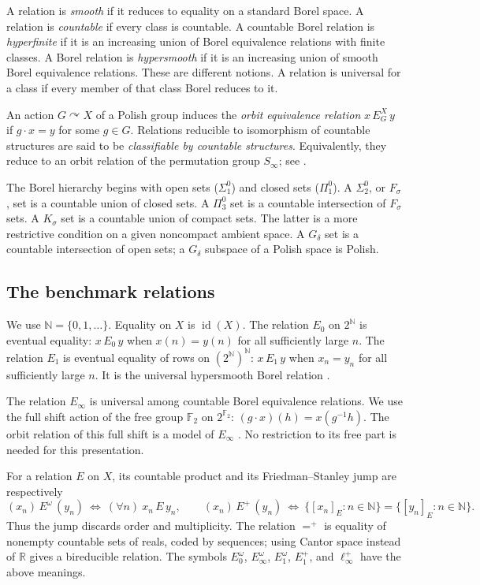 \documentclass[11pt]{article}
\numberwithin{equation}{section}
\theoremstyle{definition}
\newcommand{\N}{\mathbb N}
\newcommand{\R}{\mathbb R}
\newcommand{\id}{\operatorname{id}}
\begin{document}
A relation is \emph{smooth} if it reduces to equality on a standard
Borel space. A relation is \emph{countable} if every class is countable.
A countable Borel relation is \emph{hyperfinite} if it is an increasing
union of Borel equivalence relations with finite classes.
A Borel relation is \emph{hypersmooth} if it is an increasing
union of smooth Borel equivalence relations.
These are different notions. A relation is universal for a class if every member of that class Borel reduces to it.

An action $G\curvearrowright X$ of a Polish group induces the
\emph{orbit equivalence relation}
$x\,E_G^X\,y$ if $g\cdot x=y$ for some $g\in G$.
Relations reducible to isomorphism of countable structures are
said to be \emph{classifiable by countable structures}.
Equivalently, they reduce to an orbit relation of the permutation
group $S_\infty$; see \cite{BK,Gao}.

The Borel hierarchy begins with open sets ($\Sigma^0_1$) and
closed sets ($\Pi^0_1$). A $\Sigma^0_2$, or $F_\sigma$, set is
a countable union of closed sets. A $\Pi^0_3$ set is a countable
intersection of $F_\sigma$ sets. A $K_\sigma$ set is a
countable union of compact sets. The latter is a more restrictive
condition on a given noncompact ambient space.
A $G_\delta$ set is a countable intersection of open sets; a
$G_\delta$ subspace of a Polish space is Polish.

\subsection{The benchmark relations}
We use $\N=\{0,1,\ldots\}$. Equality on $X$ is $\id(X)$.
The relation $E_0$ on $2^\N$ is eventual equality:
$x\,E_0\,y$ when $x(n)=y(n)$ for all sufficiently large $n$.
The relation $E_1$ is eventual equality of rows on
$(2^\N)^\N$: $x\,E_1\,y$ when $x_n=y_n$ for all sufficiently
large $n$. It is the universal hypersmooth Borel relation
\cite{KL,Gao}.

The relation $E_\infty$ is universal among countable Borel equivalence
relations. We use the full shift action of the free group
$\mathbb F_2$ on $2^{\mathbb F_2}$:
$(g\cdot x)(h)=x(g^{-1}h)$. The orbit relation of this full
shift is a model of $E_\infty$ \cite{Gao}.
No restriction to its free part is needed for this presentation.

For a relation $E$ on $X$, its countable product and its
Friedman--Stanley jump are respectively
\[
 (x_n)\,E^\omega\,(y_n)\ \Longleftrightarrow\
       (\forall n)\ x_n\,E\,y_n,
 \qquad
 (x_n)\,E^+\,(y_n)\ \Longleftrightarrow\
       \{[x_n]_E:n\in\N\}=\{[y_n]_E:n\in\N\}.
\]
Thus the jump discards order and multiplicity.
The relation $=^+$ is equality of nonempty countable sets of reals,
coded by sequences; using Cantor space instead of $\R$ gives a
bireducible relation. The symbols $E_0^\omega$, $E_\infty^\omega$,
$E_1^\omega$, $E_1^+$, and $\ell_\infty^+$ have the above meanings.
\end{document}

